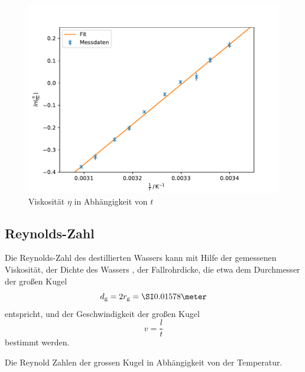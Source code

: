 \begin{figure}[H]
  \centering
  \includegraphics[]{assets/plot_1.pdf}
  \caption{Viskosität $\eta$ in Abhängigkeit von $t$}
  \label{fig:grosse_kugel_temperatur}
\end{figure}




\subsection{Reynolds-Zahl}

Die Reynolds-Zahl des destillierten Wassers kann mit Hilfe der gemessenen Viskosität, der Dichte des Wassers \cite{TfCuP},
der Fallrohrdicke, die etwa dem Durchmesser der großen Kugel
\begin{equation*}
  d_\text{g} = 2 r_\text{g} = \grosseKugelDurchmesser
\end{equation*}
entspricht, und der Geschwindigkeit der großen Kugel
\begin{equation*}
  v = \frac{l}{t}
\end{equation*}
bestimmt werden.

\begin{table}
  \centering
  
  \caption{Die Reynold Zahlen der grossen Kugel in Abhängigkeit von der Temperatur.}
  \label{tab:grosse_kugel_reynold}
\end{table}